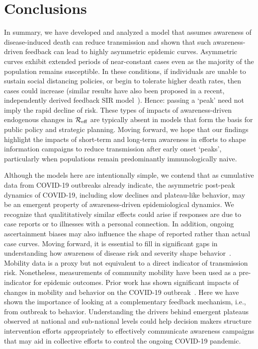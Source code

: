 \section{Conclusions}
In summary, we have developed and analyzed
a model that assumes awareness of disease-induced death can 
reduce transmission and shown that such awareness-driven feedback
can lead
to highly asymmetric epidemic curves.  Asymmetric
curves exhibit extended periods of near-constant
cases even as the majority of the population remains susceptible.
In these conditions, if individuals are unable
to sustain social
distancing policies, or begin to tolerate higher death rates, then cases 
could increase (similar results have also been proposed in a recent, independently derived feedback SIR model~\citep{franco2020feedback}). 
Hence: passing a `peak' need not imply
the rapid decline of risk.  These types of impacts of awareness-driven
endogenous changes in ${\cal{R}}_{\mathrm{eff}}$ are typically
absent in models that form the basis for public policy and strategic planning.
Moving forward, we hope that our findings
highlight the impacts of short-term and long-term awareness 
in efforts to shape information campaigns
to reduce transmission after early onset `peaks', particularly
when populations remain predominantly immunologically naive.

Although the models here are intentionally simple,
we contend that as cumulative data from COVID-19 outbreaks already
indicate, the asymmetric post-peak dynamics of COVID-19, including
slow declines and plateau-like behavior, may be an emergent
property of awareness-driven epidemiological dynamics.
We recognize that qualititatively similar effects could arise 
if responses are due to case reports or to illnesses
with a personal connection. In addition, ongoing ascertainment
biases may also influence the shape of reported rather
than actual case curves.  
Moving forward, it is essential to fill in significant
gaps in understanding how awareness of disease
risk and severity shape behavior~\citep{west_nat2020}. 
Mobility data is a proxy but
not equivalent to a direct indicator of transmission
risk. Nonetheless, measurements of community
mobility have been
used as a pre-indicator for epidemic outcomes.
Prior work has shown significant impacts of changes
in mobility and behavior on the COVID-19 outbreak~\citep{kraemer_2020sci}.
Here we have
shown the importance of looking at a complementary feedback
mechanism,
i.e., from outbreak to behavior.  
Understanding the drivers behind emergent plateaus observed
at national and sub-national levels could help decision
makers structure intervention efforts appropriately to effectively 
communicate awareness campaigns that may aid in collective
efforts to control the ongoing COVID-19 pandemic.
